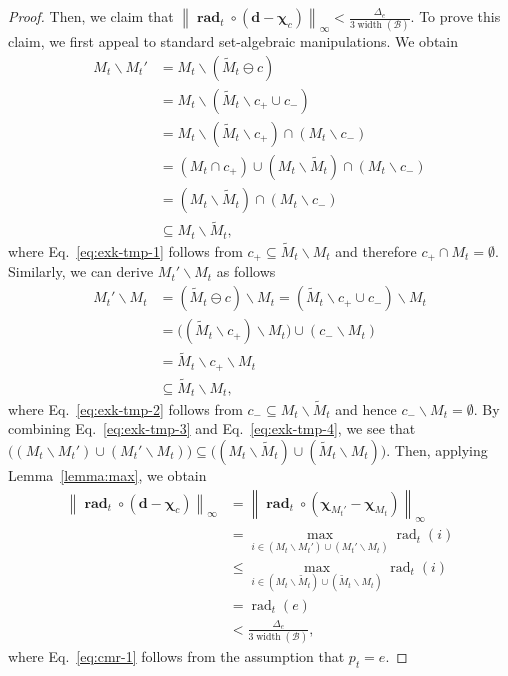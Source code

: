 \documentclass{article}
\newcommand{\B}{\mathcal B}
\newcommand{\del}{\backslash}
\DeclareMathOperator{\rank}{width}
\DeclareMathOperator{\rad}{rad}
\newcommand{\nor}[1]{\left\|#1\right\|}
\renewcommand{\vec}[1]{\boldsymbol{#1}}
\renewcommand{\odot}{\circ}
\begin{document}
\begin{proof}
Then, we claim that $\nor{\vec \rad_t \odot (\vec d-\vec \chi_c)}_\infty < \frac{\Delta_e}{3\rank(\B)}$.
To prove this claim, we first appeal to standard set-algebraic manipulations. We obtain
\begin{align}
M_t \del M_t' &= M_t \del (\tilde M_t \ominus c) \nonumber\\
              &= M_t \del (\tilde M_t \del c_+ \cup c_-) \nonumber \\
              &= M_t \del (\tilde M_t \del c_+) \cap (M_t \del c_-) \nonumber \\
              &= (M_t \cap c_+) \cup (M_t \del \tilde M_t) \cap (M_t \del c_-) \nonumber\\
              &= (M_t \del \tilde M_t) \cap (M_t \del c_-) \label{eq:exk-tmp-1}\\
              &\subseteq M_t \del \tilde M_t,\label{eq:exk-tmp-3}
\end{align}
where Eq.~\eqref{eq:exk-tmp-1} follows from $c_+ \subseteq \tilde M_t\del M_t$ and therefore $c_+ \cap M_t =\emptyset$.
Similarly, we can derive $M_t' \del M_t$ as follows
\begin{align}
M_t' \del M_t &= (\tilde M_t \ominus c) \del M_t = (\tilde M_t \del c_+ \cup c_-) \del M_t \nonumber\\
              &= \big( (\tilde M_t \del c_+) \del M_t\big) \cup (c_- \del M_t) \nonumber \\
              &= \tilde M_t \del c_+ \del M_t \label{eq:exk-tmp-2}\\
              &\subseteq \tilde M_t \del M_t,\label{eq:exk-tmp-4}
\end{align}
where Eq.~\eqref{eq:exk-tmp-2} follows from $c_-\subseteq M_t\del \tilde M_t$ and hence $c_-\del M_t =\emptyset$.
By combining Eq.~\eqref{eq:exk-tmp-3} and Eq.~\eqref{eq:exk-tmp-4}, we see that $\big((M_t \del M_t') \cup (M_t'\del M_t)\big) \subseteq \big((M_t \del \tilde M_t ) \cup (\tilde M_t \del M_t)\big)$.
Then, applying Lemma~\ref{lemma:max}, we obtain
\begin{align}
   \nor{\vec \rad_t \odot (\vec d-\vec\chi_c)}_\infty 
   &= \nor{\vec \rad_t \odot (\vec \chi_{M_t'} - \vec\chi_{M_t})}_\infty \nonumber\\
   &= \max_{i\in (M_t \del M_t') \cup (M_t'\del M_t) } \rad_t(i) \nonumber \\
   &\le \max_{i\in (M_t \del \tilde M_t ) \cup (\tilde M_t \del M_t)}  \rad_t(i) \nonumber \\
   & = \rad_t(e) \label{eq:cmr-1} \\
   & < \frac{\Delta_e}{3\rank(\B)} \label{eq:u-c-1-0},
\end{align}
where Eq.~\eqref{eq:cmr-1} follows from the assumption that $p_t = e$.


\end{proof}
\end{document}
